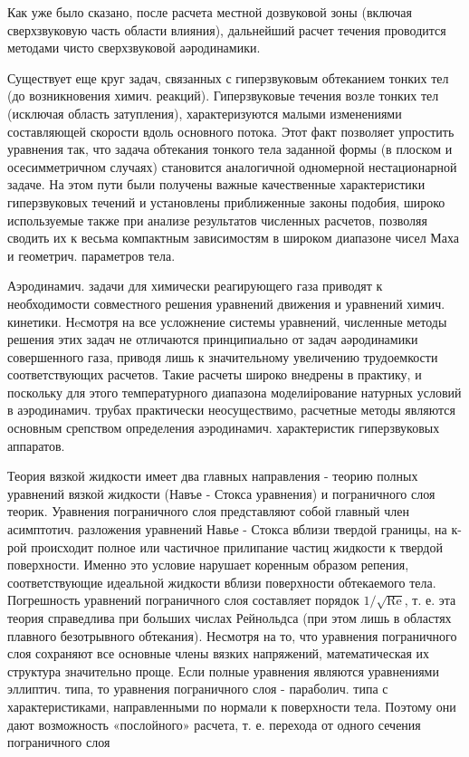 \documentclass[10pt]{article}
\begin{document}
Как уже было сказано, после расчета местной дозвуковой зоны (включая сверхзвуковую часть области влияния), дальнейший расчет течения проводится методами чисто сверхзвуковой аәродинамики.



Существует еще круг задач, связанных с гиперзвуковым обтеканием тонких тел (до возникновения химич. реакций). Гиперзвуковые течения возле тонких тел (исключая область затупления), характеризуются малыми изменениями составляющей скорости вдоль основного потока. Этот факт позволяет упростить уравнения так, что задача обтекания тонкого тела заданной формы (в плоском и осесимметричном случаях) становится аналогичной одномерной нестационарной задаче. На этом пути были получены важные качественные характеристики гиперзвуковых течений и установлены приближенные законы подобия, широко используемые также при анализе результатов численных расчетов, позволяя сводить их к весьма компактным зависимостям в широком диапазоне чисел Маха и геометрич. параметров тела.



Аэродинамич. задачи для химически реагирующего газа приводят к необходимости совместного решения уравнений движения и уравнений химич. кинетики. Нeсмотря на все усложнение системы уравнений, численные методы решения этих задач не отличаются принципиально от задач аәродинамики совершенного газа, приводя лишь к значительному увеличению трудоемкости соответствующих расчетов. Такие расчеты широко внедрены в практику, и поскольку для этого температурного диапазона моделиірование натурных условий в аэродинамич. трубах практически неосуществимо, расчетные методы являются основным срепством определения аэродинамич. характеристик гиперзвуковых аппаратов.



Теория вязкой жидкости имеет два главных направления - теорию полных уравнений вязкой жидкости (Навъе - Стокса уравнения) и пограничного слоя теорик. Уравнения пограничного слоя представляют собой главный член асимптотич. разложения уравнений Навье - Стокса вблизи твердой границы, на к-рой происходит полное или частичное прилипание частиц жидкости к твердой поверхности. Именно это условие нарушает коренным образом репения, соответствующие идеальной жидкости вблизи поверхности обтекаемого тела. Погрешность уравнений пограничного слоя составляет порядок $1 / \sqrt{\mathrm{Re}}$, т. е. эта теория справедлива при больших числах Рейнольдса (при этом лишь в областях плавного безотрывного обтекания). Несмотря на то, что уравнения пограничного слоя сохраняют все основные члены вязких напряжений, математическая их структура значительно проще. Если полные уравнения являются уравнениями эллиптич. типа, то уравнения пограничного слоя - параболич. типа с характеристиками, направленными по нормали к поверхности тела. Поэтому они дают возможность «послойного» расчета, т. е. перехода от одного сечения пограничного слоя
\end{document}

